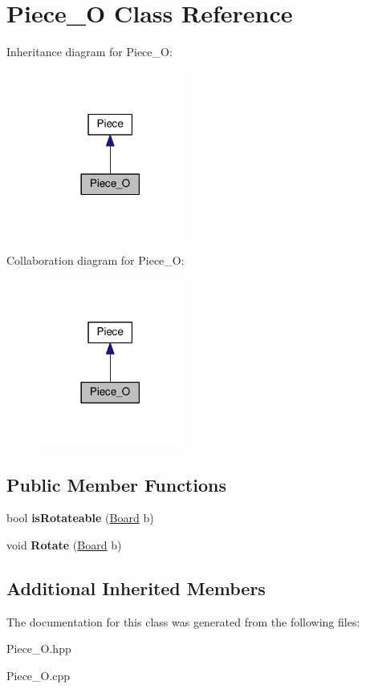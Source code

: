 \hypertarget{class_piece___o}{}\section{Piece\+\_\+O Class Reference}
\label{class_piece___o}


Inheritance diagram for Piece\+\_\+O\+:
\nopagebreak
\begin{figure}[H]
\begin{center}
\leavevmode
\includegraphics[width=134pt]{class_piece___o__inherit__graph}
\end{center}
\end{figure}


Collaboration diagram for Piece\+\_\+O\+:
\nopagebreak
\begin{figure}[H]
\begin{center}
\leavevmode
\includegraphics[width=134pt]{class_piece___o__coll__graph}
\end{center}
\end{figure}
\subsection*{Public Member Functions}
\begin{DoxyCompactItemize}
\item 
\mbox{\label{class_piece___o_af82900ecec4e7bd058d43825293d8bff}} 
bool {\bfseries is\+Rotateable} (\hyperlink{class_board}{Board} b)
\item 
\mbox{\label{class_piece___o_a69812f938582f176cd4cca997cbb87c1}} 
void {\bfseries Rotate} (\hyperlink{class_board}{Board} b)
\end{DoxyCompactItemize}
\subsection*{Additional Inherited Members}


The documentation for this class was generated from the following files\+:\begin{DoxyCompactItemize}
\item 
Piece\+\_\+\+O.\+hpp\item 
Piece\+\_\+\+O.\+cpp\end{DoxyCompactItemize}
